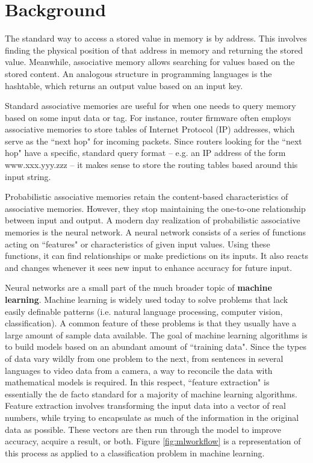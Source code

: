 \documentclass{sig-alternate}
\begin{document}
\section{Background}
\label{sec:background}

The standard way to access a stored value in memory is by address. 
This involves finding the physical position of that address in memory
and returning the stored value. Meanwhile, associative memory allows
searching for values based on the stored content. An analogous structure
in programming languages is the hashtable, which returns an output value
based on an input key. 

Standard associative memories are useful for when one needs to query memory based 
on some input data or tag. For instance, router firmware often employs associative 
memories to store tables of Internet Protocol (IP) addresses, which serve as the ``next hop" for incoming 
packets. Since routers looking for the ``next hop" have a specific, standard query 
format -- e.g. an IP address of the form www.xxx.yyy.zzz -- it makes sense to store the 
routing tables based around this input string.

Probabilistic associative memories retain the content-based characteristics of associative memories.
However, they stop maintaining the one-to-one relationship between input and output.
A modern day realization of probabilistic associative memories is the neural network. A neural network
consists of a series of functions acting on ``features" or characteristics of given input values. Using
these functions, it can find relationships or make predictions on its inputs. It also
reacts and changes whenever it sees new input to enhance accuracy for future input.

Neural networks are a small part of the much broader topic of \textbf{machine learning}. Machine learning
is widely used today to solve problems that lack easily definable patterns (i.e. natural language processing,
computer vision, classification). A common feature of these problems is that they usually have a large amount
of sample data available. The goal of machine learning algorithms is to build models based on an
abundant amount of ``training data". Since the types of data vary wildly from one problem to the next,
from sentences in several languages to video data from a camera, a way to reconcile the data with
mathematical models is required. In this respect, ``feature extraction" is essentially the de facto
standard for a majority of machine learning algorithms. Feature extraction involves transforming the
input data into a vector of real numbers, while trying to encapsulate as much of the information
in the original data as possible. These vectors are then run through the model to improve accuracy,
acquire a result, or both. Figure \ref{fig:mlworkflow} is a representation of this process as
applied to a classification problem in machine learning. 
\end{document}

